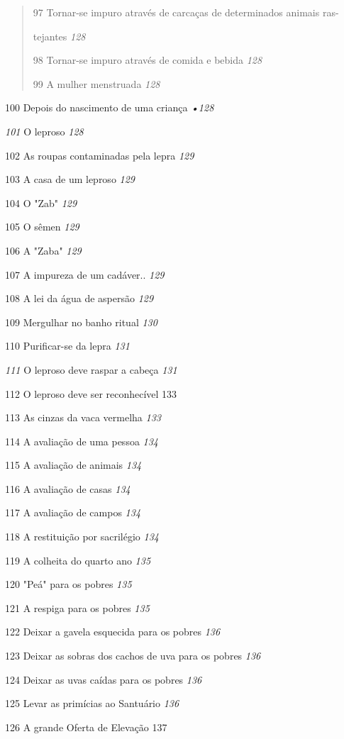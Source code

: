 \begin{quote}
97 Tornar-se impuro através de carcaças de determinados animais ras-

tejantes \emph{128}

98 Tornar-se impuro através de comida e bebida \emph{128}

99 A mulher menstruada \emph{128}
\end{quote}

100 Depois do nascimento de uma criança \emph{•128}

\emph{101} O leproso \emph{128}

102 As roupas contaminadas pela lepra \emph{129}

103 A casa de um leproso \emph{129}

104 O "Zab" \emph{129}

105 O sêmen \emph{129}

106 A "Zaba" \emph{129}

107 A impureza de um cadáver.. \emph{129}

108 A lei da água de aspersão \emph{129}

109 Mergulhar no banho ritual \emph{130}

110 Purificar-se da lepra \emph{131}

\emph{111} O leproso deve raspar a cabeça \emph{131}

112 O leproso deve ser reconhecível 133

113 As cinzas da vaca vermelha \emph{133}

114 A avaliação de uma pessoa \emph{134}

115 A avaliação de animais \emph{134}

116 A avaliação de casas \emph{134}

117 A avaliação de campos \emph{134}

118 A restituição por sacrilégio \emph{134}

119 A colheita do quarto ano \emph{135}

120 "Peá" para os pobres \emph{135}

121 A respiga para os pobres \emph{135}

122 Deixar a gavela esquecida para os pobres \emph{136}

123 Deixar as sobras dos cachos de uva para os pobres \emph{136}

124 Deixar as uvas caídas para os pobres \emph{136}

125 Levar as primícias ao Santuário \emph{136}

126 A grande Oferta de Elevação 137

